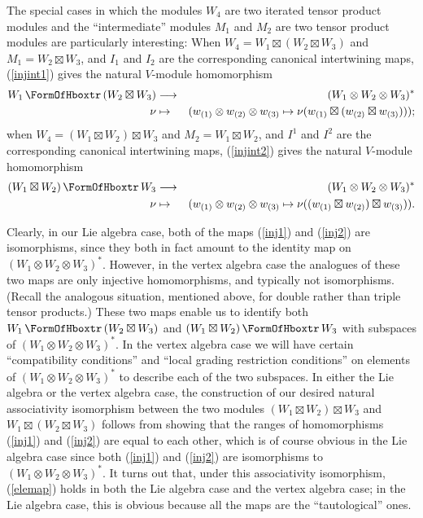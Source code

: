 \documentclass[12pt]{article}
\begin{document}
The special cases in which the modules $W_4$ are two iterated tensor
product modules and the ``intermediate'' modules $M_1$ and $M_2$ are
two tensor product modules are particularly interesting: When
$W_4=W_1\boxtimes (W_2\boxtimes W_3)$ and $M_1=W_2\boxtimes W_3$, and
$I_1$ and $I_2$ are the corresponding canonical intertwining maps,
(\ref{injint1}) gives the natural $V$-module homomorphism
\begin{eqnarray}
W_1\,\hboxtr \,(W_2 \boxtimes W_3)&\longrightarrow &(W_1\otimes
W_2\otimes W_3)^*\nno\\
\nu&\mapsto &(w_{(1)}\otimes w_{(2)}\otimes w_{(3)}\mapsto \nu
(w_{(1)}\boxtimes (w_{(2)}\boxtimes w_{(3)})));\nno\\
\label{inj1}
\end{eqnarray}
when $W_4=(W_1\boxtimes W_2)\boxtimes W_3$ and $M_2=W_1\boxtimes W_2$,
and $I^1$ and $I^2$ are the corresponding canonical intertwining maps,
(\ref{injint2}) gives the natural $V$-module homomorphism
\begin{eqnarray}
(W_1 \boxtimes W_2)\,\hboxtr \,W_3&\longrightarrow & (W_1\otimes
W_2\otimes W_3)^*\nno\\
\nu&\mapsto &(w_{(1)}\otimes w_{(2)}\otimes w_{(3)}\mapsto \nu
((w_{(1)}\boxtimes w_{(2)})\boxtimes w_{(3)})).\nno\\
\label{inj2}
\end{eqnarray}

Clearly, in our Lie algebra case, both of the maps (\ref{inj1}) and
(\ref{inj2}) are isomorphisms, since they both in fact amount to the
identity map on $(W_1\otimes W_2\otimes W_3)^*$.  However, in the
vertex algebra case the analogues of these two maps are only injective
homomorphisms, and typically not isomorphisms.  (Recall the analogous
situation, mentioned above, for double rather than triple tensor
products.)  These two maps enable us to identify both $W_1\,\hboxtr
\,(W_2 \boxtimes W_3)$ and $(W_1 \boxtimes W_2)\,\hboxtr \,W_3$ with
subspaces of $(W_1\otimes W_2\otimes W_3)^*$.  In the vertex algebra
case we will have certain ``compatibility conditions'' and ``local
grading restriction conditions'' on elements of $(W_1\otimes
W_2\otimes W_3)^*$ to describe each of the two subspaces.  In either
the Lie algebra or the vertex algebra case, the construction of our
desired natural associativity isomorphism between the two modules
$(W_1 \boxtimes W_2)\boxtimes W_3$ and $W_1\boxtimes(W_2 \boxtimes
W_3)$ follows {}from showing that the ranges of homomorphisms
(\ref{inj1}) and (\ref{inj2}) are equal to each other, which is of
course obvious in the Lie algebra case since both (\ref{inj1}) and
(\ref{inj2}) are isomorphisms to $(W_1\otimes W_2\otimes W_3)^*$.  It
turns out that, under this associativity isomorphism, (\ref{elemap})
holds in both the Lie algebra case and the vertex algebra case; in the
Lie algebra case, this is obvious because all the maps are the
``tautological'' ones.
\end{document}
